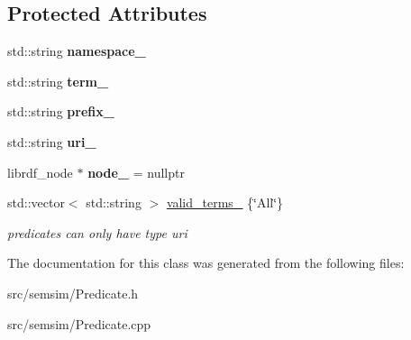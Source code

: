 \subsection*{Protected Attributes}
\begin{DoxyCompactItemize}
\item 
\mbox{\label{classsemsim_1_1Predicate_ad74a27f704532cdc6a80e094c2d5b3f4}} 
std\+::string {\bfseries namespace\+\_\+}
\item 
\mbox{\label{classsemsim_1_1Predicate_acb9c36ea2356d2b8791a2e8ad9cf68eb}} 
std\+::string {\bfseries term\+\_\+}
\item 
\mbox{\label{classsemsim_1_1Predicate_acb69247cf1ff304bfaec2df1755b4654}} 
std\+::string {\bfseries prefix\+\_\+}
\item 
\mbox{\label{classsemsim_1_1Predicate_a6ceaeb4b2a9a431cfdfe537be842edd2}} 
std\+::string {\bfseries uri\+\_\+}
\item 
\mbox{\label{classsemsim_1_1Predicate_a9a488e0bf03949975fa54d2de0b2fd58}} 
librdf\+\_\+node $\ast$ {\bfseries node\+\_\+} = nullptr
\item 
\mbox{\label{classsemsim_1_1Predicate_aaffa9838c17b7bc7c33559ef1253a594}} 
std\+::vector$<$ std\+::string $>$ \hyperlink{classsemsim_1_1Predicate_aaffa9838c17b7bc7c33559ef1253a594}{valid\+\_\+terms\+\_\+} \{\char`\"{}All\char`\"{}\}
\begin{DoxyCompactList}\small\item\em predicates can only have type uri \end{DoxyCompactList}\end{DoxyCompactItemize}


The documentation for this class was generated from the following files\+:\begin{DoxyCompactItemize}
\item 
src/semsim/Predicate.\+h\item 
src/semsim/Predicate.\+cpp\end{DoxyCompactItemize}
